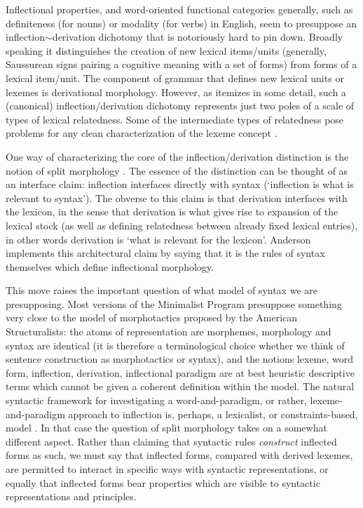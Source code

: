 \documentclass[output=paper,
modfonts
]{LSP/langsci}
\begin{document}
Inflectional properties, and word-oriented functional categories generally, such as definiteness (for nouns) or modality (for verbs) in English, seem to presuppose an inflection$\sim$derivation dichotomy that is notoriously hard to pin down. Broadly speaking it distinguishes the creation of new lexical items/units (generally, Saussurean signs pairing a cognitive meaning with a set of forms) from forms of a lexical item/unit. The component of grammar that defines new lexical units or lexemes is derivational morphology. However,  as \textcite{Spencer13:book} %
itemizes in some detail, such a (canonical) inflection/derivation dichotomy represents just two poles of a scale of types of lexical relatedness. 
Some of the intermediate types of relatedness pose problems for any clean characterization of the lexeme concept 
\parencite[part of the problem of ‘lexemic individuation’,][]{Spencer16:individuating}.

 One way of characterizing the core of the inflection/derivation distinction is the notion of split morphology 	\parencite[][and subsequent references]{AndersonSR82}.
 The essence of the distinction can be thought of as an interface claim: inflection interfaces directly with syntax (\textquoteleft inflection is what is relevant to syntax\textquoteright). The obverse to this claim is that derivation interfaces with the lexicon, in the sense that derivation is what gives rise to expansion of the lexical stock (as well as defining relatedness between already fixed lexical entries), in other words derivation is \textquoteleft what is relevant for the lexicon\textquoteright. Anderson implements this architectural claim by saying that it is the rules of syntax themselves which define inflectional morphology. 
  
This move raises the important question of what model of syntax we are presupposing. Most versions of the Minimalist Program
presuppose something very close to the model of morphotactics proposed by the American Structuralists:
the atoms of representation are morphemes, morphology and syntax are identical (it is therefore a terminological choice whether we think of sentence construction as morphotactics or syntax), and the notions lexeme, word form, inflection, derivation, inflectional paradigm are at best heuristic descriptive terms which cannot be given a coherent definition within the model. The natural syntactic framework for investigating a word-and-paradigm, or rather, lexeme-and-paradigm approach to inflection is, perhaps, a lexicalist, or constraints-based,
model \parencite{Miller:Sag97,Sadler:Spencer01,Sadler:Nordlinger06:stacking}. %
 In that case the question of split morphology takes on a somewhat different aspect. Rather than claiming that syntactic rules \emph{construct} inflected forms as such, we must say that inflected forms, compared with derived lexemes, are permitted to  interact in specific ways with syntactic representations, or equally that inflected forms bear properties which are visible to syntactic representations and principles. 
 
\end{document}
